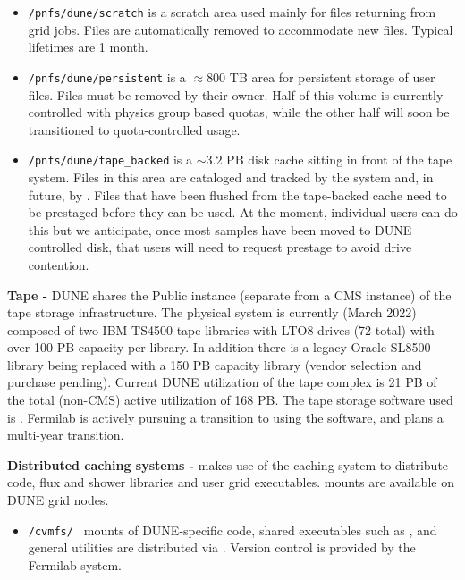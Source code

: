 \documentclass[../main-v1.tex]{subfiles}
\begin{document}
\begin{description}
\begin{itemize}
    \item {\tt /pnfs/dune/scratch}  is a scratch area used mainly for files returning from grid jobs.  Files are automatically removed to accommodate new files. Typical lifetimes are 1 month. 
     \item {\tt /pnfs/dune/persistent} is a $\approx 800$ TB area for persistent storage of user files.  Files must be removed by their owner. Half of this volume is currently controlled with physics group based quotas, while the other half will soon be transitioned to quota-controlled usage.
      \item {\tt /pnfs/dune/tape\_backed} is a $\sim 3.2$ PB disk cache sitting in front of the  tape system. Files in this area are cataloged and tracked by the  system and, in future, by . Files that have been flushed from the tape-backed cache need to be prestaged before they can be used.  At the moment, individual users can do this but we anticipate, once most samples have been moved to DUNE controlled disk, that users will need to request prestage to avoid drive contention. 
\end{itemize}

\item{\bf Tape -} DUNE shares the Public instance (separate from a CMS instance) of the tape storage infrastructure.  The physical system is currently (March 2022) composed of two IBM TS4500 tape libraries with LTO8 drives (72 total) with over 100 PB capacity per library.  In addition there is a legacy Oracle SL8500 library being replaced with a 150 PB capacity library (vendor selection and purchase pending).  Current DUNE utilization of the tape complex is 21 PB of the total (non-CMS) active utilization of 168 PB.
The tape storage software used is .  Fermilab is actively pursuing a transition to using the   software, and plans a multi-year transition.


\item{\bf Distributed caching systems - }  makes use of the  caching system to distribute code, flux and shower libraries and user grid executables.  mounts are available on DUNE grid nodes. 



\begin{itemize}
    \item {\tt /cvmfs/ } mounts of DUNE-specific code,  shared executables such as , and general utilities are distributed via . Version control is provided by the Fermilab  system. 
    

\end{itemize}
\end{description}
\end{document}
